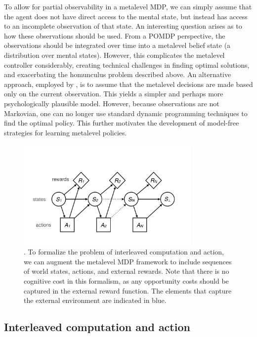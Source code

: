 To allow for partial observability in a metalevel MDP, we can simply assume that the agent does not have direct access to the mental state, but instead has access to an incomplete observation of that state. An interesting question arises as to how these observations should be used. From a POMDP perspective, the observations should be integrated over time into a metalevel belief state (a distribution over mental states). However, this complicates the metalevel controller considerably, creating technical challenges in finding optimal solutions, and exacerbating the homunculus problem described above. An alternative approach, employed by \citet{suchow2016deciding}, is to assume that the metalevel decisions are made based only on the current observation. This yields a simpler and perhaps more psychologically plausible model. However, because observations are not Markovian, one can no longer use standard dynamic programming techniques to find the optimal policy. This further motivates the development of model-free strategies for learning metalevel policies.

\begin{figure}
  \centering
  \includegraphics[width=0.8\textwidth,page=3,trim=0 50 0 50]{diagrams/metamdp.pdf}
  \caption{. To formalize the problem of interleaved computation and action, we can augment the metalevel MDP framework to include sequences of world states, actions, and external rewards. Note that there is no cognitive cost in this formalism, as any opportunity costs should be captured in the external reward function. The elements that capture the external environment are indicated in blue.
  }
  \label{fig:metamdp-joint}
\end{figure}

\subsection{Interleaved computation and action}\label{sec:interleaved}


